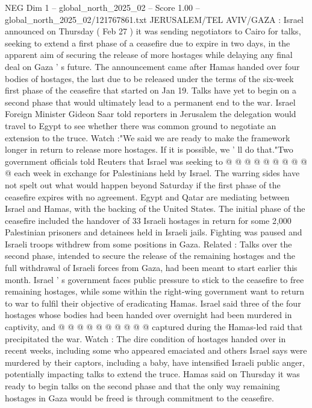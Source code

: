 \begin{textsample}{NEG Dim 1 – global\_north\_2025\_02 – Score 1.00 – global\_north\_2025\_02/121767861.txt}  \label{ex:f1_neg_004}
JERUSALEM/TEL AVIV/GAZA : Israel announced on Thursday ( Feb 27 ) it was sending negotiators to Cairo for talks, seeking to extend a first phase of a ceasefire due to expire in two days, in the apparent aim of securing the release of more hostages while delaying any final deal on Gaza ' s future.
The announcement came after Hamas handed over four bodies of hostages, the last due to be released under the terms of the six-week first phase of the ceasefire that started on Jan 19.
Talks have yet to begin on a second phase that would ultimately lead to a permanent end to the war.
Israel Foreign Minister Gideon Saar told reporters in Jerusalem the delegation would travel to Egypt to see whether there was common ground to negotiate an extension to the truce.
Watch :"We said we are ready to make the framework longer in return to release more hostages.
If it is possible, we ' ll do that."Two government officials told Reuters that Israel was seeking to @ @ @ @ @ @ @ @ @ @ each week in exchange for Palestinians held by Israel.
The warring sides have not spelt out what would happen beyond Saturday if the first phase of the ceasefire expires with no agreement.
Egypt and Qatar are mediating between Israel and Hamas, with the backing of the United States.
The initial phase of the ceasefire included the handover of 33 Israeli hostages in return for some 2,000 Palestinian prisoners and detainees held in Israeli jails.
Fighting was paused and Israeli troops withdrew from some positions in Gaza.
Related : Talks over the second phase, intended to secure the release of the remaining hostages and the full withdrawal of Israeli forces from Gaza, had been meant to start earlier this month.
Israel ' s government faces public pressure to stick to the ceasefire to free remaining hostages, while some within the right-wing government want to return to war to fulfil their objective of eradicating Hamas.
Israel said three of the four hostages whose bodies had been handed over overnight had been murdered in captivity, and @ @ @ @ @ @ @ @ @ @ captured during the Hamas-led raid that precipitated the war.
Watch : The dire condition of hostages handed over in recent weeks, including some who appeared emaciated and others Israel says were murdered by their captors, including a baby, have intensified Israeli public anger, potentially impacting talks to extend the truce.
Hamas said on Thursday it was ready to begin talks on the second phase and that the only way remaining hostages in Gaza would be freed is through commitment to the ceasefire.

\end{textsample}

